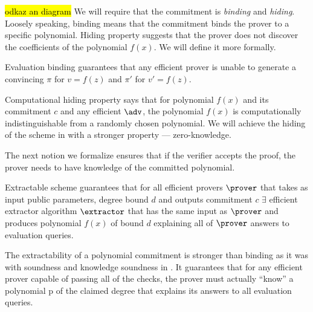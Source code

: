 
\hl{odkaz an diagram}
We will require that the commitment is \textit{binding} and \textit{hiding}. Loosely speaking, binding means that the commitment binds the prover to a specific polynomial. Hiding property suggests that the prover does not discover the coefficients of the polynomial $f(x)$. We will define it more formally.

\begin{definition}{Evaluation binding}
    guarantees that any efficient prover is unable to generate a convincing $\pi$ for $v = f(z)$ and $\pi'$ for $v' = f(z)$.
\end{definition}

Computational hiding property says that for polynomial $f(x)$ and its commitment $c$ and any efficient $\adv$, the polynomial $f(x)$ is computationally indistinguishable from a randomly chosen polynomial. We will achieve the hiding of the scheme in  with a stronger property — zero-knowledge.


The next notion we formalize ensures that if the verifier accepts the proof, the prover needs to have knowledge of the committed polynomial.

\begin{definition}{Extractable scheme}
    guarantees that for all efficient provers $\prover$ that takes as input public parameters, degree bound $d$ and outputs commitment $c$ $\exists$ efficient extractor algorithm $\extractor$ that has the same input as $\prover$ and produces polynomial $f(x)$ of bound $d$ explaining all of $\prover$ answers to evaluation queries.
\end{definition}

The extractability of a polynomial commitment is stronger than binding as it was with soundness and knowledge soundness in . It guarantees that for any efficient prover capable of passing all of the checks, the prover must actually “know” a
polynomial p of the claimed degree that explains its answers to all evaluation queries.

